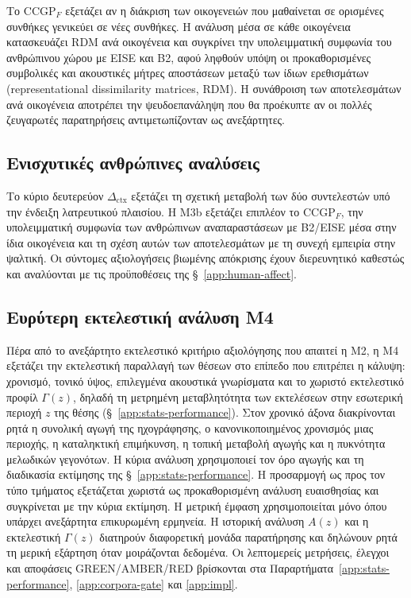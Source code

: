 \documentclass[11pt,a4paper]{article}
\begin{document}
Το $\mathrm{CCGP}_F$ εξετάζει αν η διάκριση των οικογενειών που μαθαίνεται σε ορισμένες συνθήκες γενικεύει σε νέες συνθήκες. Η ανάλυση μέσα σε κάθε οικογένεια κατασκευάζει RDM ανά οικογένεια και συγκρίνει την υπολειμματική συμφωνία του ανθρώπινου χώρου με EISE και B2, αφού ληφθούν υπόψη οι προκαθορισμένες συμβολικές και ακουστικές μήτρες αποστάσεων μεταξύ των ίδιων ερεθισμάτων (representational dissimilarity matrices, RDM). Η συνάθροιση των αποτελεσμάτων ανά οικογένεια αποτρέπει την ψευδοεπανάληψη που θα προέκυπτε αν οι πολλές ζευγαρωτές παρατηρήσεις αντιμετωπίζονταν ως ανεξάρτητες.

\subsection{Ενισχυτικές ανθρώπινες αναλύσεις}\label{sec:human-secondary}

Το κύριο δευτερεύον $\Delta_{\mathrm{ctx}}$ εξετάζει τη σχετική μεταβολή των δύο συντελεστών υπό την ένδειξη λατρευτικού πλαισίου. Η M3b εξετάζει επιπλέον το $\mathrm{CCGP}_F$, την υπολειμματική συμφωνία των ανθρώπινων αναπαραστάσεων με B2/EISE μέσα στην ίδια οικογένεια και τη σχέση αυτών των αποτελεσμάτων με τη συνεχή εμπειρία στην ψαλτική. Οι σύντομες αξιολογήσεις βιωμένης απόκρισης έχουν διερευνητικό καθεστώς και αναλύονται με τις προϋποθέσεις της §~\ref{app:human-affect}.

\subsection{Ευρύτερη εκτελεστική ανάλυση M4}\label{sec:m4-broader}

Πέρα από το ανεξάρτητο εκτελεστικό κριτήριο αξιολόγησης που απαιτεί η M2, η M4 εξετάζει την εκτελεστική παραλλαγή των θέσεων στο επίπεδο που επιτρέπει η κάλυψη: χρονισμό, τονικό ύψος, επιλεγμένα ακουστικά γνωρίσματα και το χωριστό εκτελεστικό προφίλ $\Gamma(z)$, δηλαδή τη μετρημένη μεταβλητότητα των εκτελέσεων στην εσωτερική περιοχή $z$ της θέσης (§~\ref{app:stats-performance}). Στον χρονικό άξονα διακρίνονται ρητά η συνολική αγωγή της ηχογράφησης, ο κανονικοποιημένος χρονισμός μιας περιοχής, η καταληκτική επιμήκυνση, η τοπική μεταβολή αγωγής και η πυκνότητα μελωδικών γεγονότων. Η κύρια ανάλυση χρησιμοποιεί τον όρο αγωγής και τη διαδικασία εκτίμησης της §~\ref{app:stats-performance}. Η προσαρμογή ως προς τον τύπο τμήματος εξετάζεται χωριστά ως προκαθορισμένη ανάλυση ευαισθησίας και συγκρίνεται με την κύρια εκτίμηση. Η μετρική έμφαση χρησιμοποιείται μόνο όπου υπάρχει ανεξάρτητα επικυρωμένη ερμηνεία. Η ιστορική ανάλυση $A(z)$ και η εκτελεστική $\Gamma(z)$ διατηρούν διαφορετική μονάδα παρατήρησης και δηλώνουν ρητά τη μερική εξάρτηση όταν μοιράζονται δεδομένα. Οι λεπτομερείς μετρήσεις, έλεγχοι και αποφάσεις GREEN/AMBER/RED βρίσκονται στα Παραρτήματα~\ref{app:stats-performance}, \ref{app:corpora-gate} και \ref{app:impl}.
\end{document}
